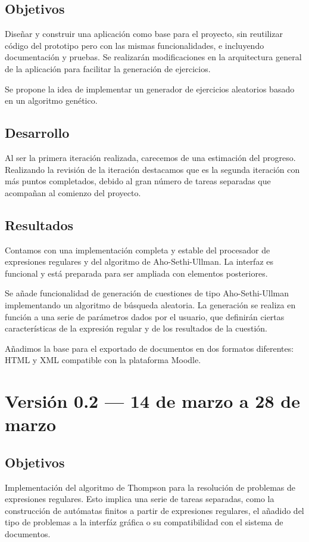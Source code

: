 \subsection{Objetivos}
Diseñar y construir una aplicación como base para el proyecto, sin reutilizar código del prototipo pero con las mismas funcionalidades, e incluyendo documentación y pruebas.
Se realizarán modificaciones en la arquitectura general de la aplicación para facilitar la generación de ejercicios.

Se propone la idea de implementar un generador de ejercicios aleatorios basado en un algoritmo genético.

\subsection{Desarrollo}
Al ser la primera iteración realizada, carecemos de una estimación del progreso.
Realizando la revisión de la iteración destacamos que es la segunda iteración con más puntos completados, debido al gran número de tareas separadas que acompañan al comienzo del proyecto.


\subsection{Resultados}
Contamos con una implementación completa y estable del procesador de expresiones regulares y del algoritmo de Aho-Sethi-Ullman.
La interfaz es funcional y está preparada para ser ampliada con elementos posteriores.

Se añade funcionalidad de generación de cuestiones de tipo Aho-Sethi-Ullman implementando un algoritmo de búsqueda aleatoria.
La generación se realiza en función a una serie de parámetros dados por el usuario, que definirán ciertas características de la expresión regular y de los resultados de la cuestión.

Añadimos la base para el exportado de documentos en dos formatos diferentes: HTML y XML compatible con la plataforma Moodle.

\section{Versión 0.2 --- 14 de marzo a 28 de marzo}
\subsection{Objetivos}
Implementación del algoritmo de Thompson para la resolución de problemas de expresiones regulares.
Esto implica una serie de tareas separadas, como la construcción de autómatas finitos a partir de expresiones regulares, el añadido del tipo de problemas a la interfáz gráfica o su compatibilidad con el sistema de documentos.

